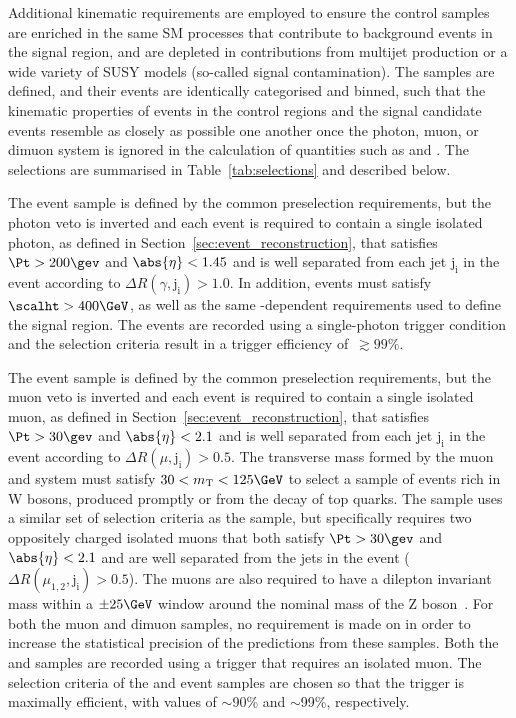 Additional kinematic requirements are employed to ensure the control
samples are enriched in the same SM processes that contribute to
background events in the signal region, and are depleted in
contributions from multijet production or a wide variety of SUSY
models (\ie so-called signal contamination).  The samples are defined,
and their events are identically categorised and binned, such that the
kinematic properties of events in the control regions and the signal
candidate events resemble as closely as possible one another once the
photon, muon, or dimuon system is ignored in the calculation of
quantities such as \scalht and \HTmiss. The selections are summarised
in Table~\ref{tab:selections} and described below.

The \gj event sample is defined by the common preselection
requirements, but the photon veto is inverted and each event is
required to contain a single isolated photon, as defined in
Section~\ref{sec:event_reconstruction}, that satisfies $\Pt > 200\gev$
and $\abs{\eta} < 1.45$ and is well separated from each jet
$\mathrm{j_i}$ in the event according to $\Delta
R(\gamma,\mathrm{j_i}) > 1.0$. 
In addition, events must satisfy $\scalht > 400\GeV$, as well as the
same \scalht-dependent \alphat requirements used to define the signal
region. The events are recorded using a single-photon trigger
condition and the selection criteria result in a trigger efficiency
of~$\gtrsim 99\%$.

The \mj event sample is defined by the common preselection
requirements, but the muon veto is inverted and each event is required
to contain a single isolated muon, as defined in
Section~\ref{sec:event_reconstruction}, that satisfies $\Pt > 30\gev$
and $\abs{\eta} < 2.1$ and is well separated from each jet
$\mathrm{j_i}$ in the event according to $\Delta R(\mu,\mathrm{j_i}) >
0.5$.
The transverse mass formed by the muon \Pt and \ptvecmiss system must
satisfy $30 < m_\text{T} < 125\GeV$ to select a sample of events rich
in W bosons, produced promptly or from the decay of top quarks. The
\mmj sample uses a similar set of selection criteria as the \mj
sample, but specifically requires two oppositely charged isolated
muons that both satisfy $\Pt > 30\gev$ and $\abs{\eta} < 2.1$ and are
well separated from the jets in the event ($\Delta
R(\mu_{1,2},\mathrm{j_i}) > 0.5$). The muons are also required to have
a dilepton invariant mass within a $\pm 25\GeV$ window around the
nominal mass of the Z boson~\cite{1674-1137-38-9-090001}. For both the
muon and dimuon samples, no requirement is made on \alphat in order to
increase the statistical precision of the predictions from these
samples. Both the \mj and \mmj samples are recorded using a trigger
that requires an isolated muon. The selection criteria of the \mj and
\mmj event samples are chosen so that the trigger is maximally
efficient, with values of $\sim$90\% and $\sim$99\%, respectively.
